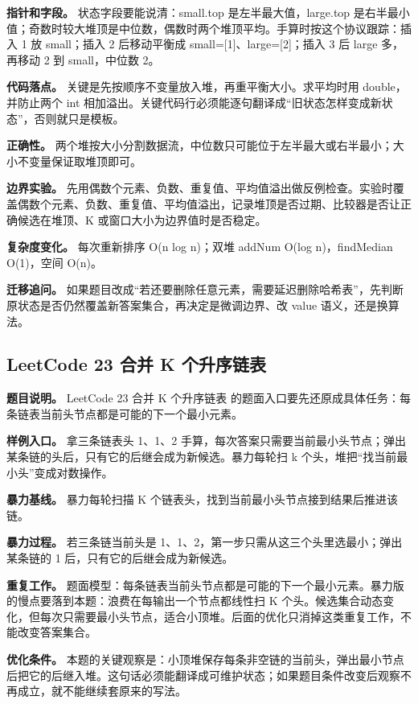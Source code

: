 \textbf{指针和字段。} 状态字段要能说清：small.top 是左半最大值，large.top 是右半最小值；奇数时较大堆顶是中位数，偶数时两个堆顶平均。手算时按这个协议跟踪：插入 1 放 small；插入 2 后移动平衡成 small=[1]、large=[2]；插入 3 后 large 多，再移动 2 到 small，中位数 2。

\textbf{代码落点。} 关键是先按顺序不变量放入堆，再重平衡大小。求平均时用 double，并防止两个 int 相加溢出。关键代码行必须能逐句翻译成“旧状态怎样变成新状态”，否则就只是模板。

\textbf{正确性。} 两个堆按大小分割数据流，中位数只可能位于左半最大或右半最小；大小不变量保证取堆顶即可。

\textbf{边界实验。} 先用偶数个元素、负数、重复值、平均值溢出做反例检查。实验时覆盖偶数个元素、负数、重复值、平均值溢出，记录堆顶是否过期、比较器是否让正确候选在堆顶、K 或窗口大小为边界值时是否稳定。

\textbf{复杂度变化。} 每次重新排序 O(n log n)；双堆 addNum O(log n)，findMedian O(1)，空间 O(n)。

\textbf{迁移追问。} 如果题目改成“若还要删除任意元素，需要延迟删除哈希表”，先判断原状态是否仍然覆盖新答案集合，再决定是微调边界、改 value 语义，还是换算法。

\subsection{LeetCode 23 合并 K 个升序链表}

\textbf{题目说明。} LeetCode 23 合并 K 个升序链表 的题面入口要先还原成具体任务：每条链表当前头节点都是可能的下一个最小元素。

\textbf{样例入口。} 拿三条链表头 1、1、2 手算，每次答案只需要当前最小头节点；弹出某条链的头后，只有它的后继会成为新候选。暴力每轮扫 k 个头，堆把“找当前最小头”变成对数操作。

\textbf{暴力基线。} 暴力每轮扫描 K 个链表头，找到当前最小头节点接到结果后推进该链。

\textbf{暴力过程。} 若三条链当前头是 1、1、2，第一步只需从这三个头里选最小；弹出某条链的 1 后，只有它的后继会成为新候选。

\textbf{重复工作。} 题面模型：每条链表当前头节点都是可能的下一个最小元素。暴力版的慢点要落到本题：浪费在每输出一个节点都线性扫 K 个头。候选集合动态变化，但每次只需要最小头节点，适合小顶堆。后面的优化只消掉这类重复工作，不能改变答案集合。

\textbf{优化条件。} 本题的关键观察是：小顶堆保存每条非空链的当前头，弹出最小节点后把它的后继入堆。这句话必须能翻译成可维护状态；如果题目条件改变后观察不再成立，就不能继续套原来的写法。

